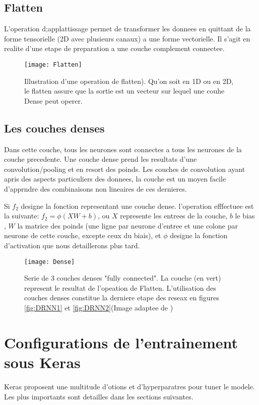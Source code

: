 \subsection{Flatten}
L'operation d;applattissage permet de transformer les donnees en quittant de la forme tensorielle (2D avec plusieurs canaux) a une forme vectorielle. Il s'agit en realite d'une etape de preparation a une couche complement connectee.

\begin{figure}[!h] 
\centering
\texttt{[image: Flatten]}
\decoRule
\caption[Flatten]{Illustration d'une operation de flatten). Qu'on soit en 1D ou en 2D, le flatten assure que la sortie est un vecteur sur lequel une couhe Dense peut operer.}
\label{fig:Flatten}
\end{figure} 

\subsection{Les couches denses}
Dans cette couche, tous les neurones sont connectes a tous les neurones de la couche precedente. Une couche dense prend les resultats d'une convolution/pooling et en resort des poinds. Les couches de convolution ayant apris des aspects particuliers des donnees, la couche est un moyen facile d'apprndre des combinaisons non lineaires de ces dernieres.

Si $f_2$ designe la fonction representant une couche dense. l'operation efffectuee est la suivante: $f_2=\phi(XW+b)$, ou $X$ represente les entrees de la couche, $b$ le bias , $W$ la matrice des poinds (une ligne par neurone d'entree et une colone par neurone de cette couche, excepte ceux du biais), et $\phi$ designe la fonction d'activation que nous detaillerons plus tard. \parencite[286]{Reference8}

\begin{figure}[!h] 
\centering
\texttt{[image: Dense]} 
\decoRule
\caption[Dense]{Serie de 3 couches denses "fully connected". La couche (en vert) represent le resultat de l'opeation de Flatten. L'utilisation des couches denses constitue la derniere etape des reseax en figures \ref{fig:DRNN1} et \ref{fig:DRNN2}(Image adaptee de \parencite{Reference9})}
\label{fig:Dense}
\end{figure}


\section{Configurations de l'entrainement sous Keras}
Keras proposent une multitude d'otions et d'hyperparatres pour tuner le modele. Les plus importants sont detailles dans les sections suivantes.

